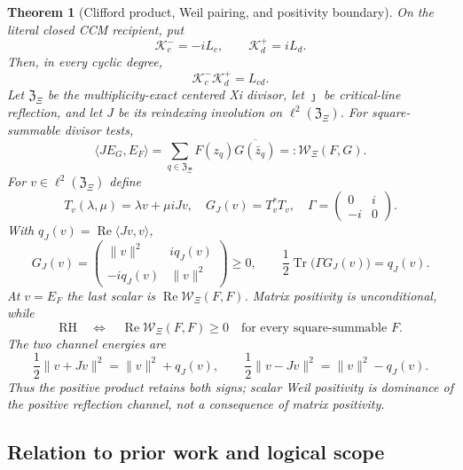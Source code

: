 \documentclass[11pt,reqno]{amsart}
\newtheorem{theorem}{Theorem}[section]
\newcommand{\Tr}{\operatorname{Tr}}
\begin{document}
\begin{theorem}[Clifford product, Weil pairing, and positivity boundary]
\label{thm:cliffordweil}
On the literal closed CCM recipient, put
\[
             \mathcal K_c^-=-iL_c,\qquad \mathcal K_d^+=iL_d.
\]
Then, in every cyclic degree,
\[
                    \mathcal K_c^-\mathcal K_d^+=L_{cd}.       \tag{1.22}
\]
Let $\mathfrak Z_\Xi$ be the multiplicity-exact centered Xi divisor, let
$\jmath$ be critical-line reflection, and let $J$ be its reindexing involution on
$\ell^2(\mathfrak Z_\Xi)$.  For square-summable divisor tests,
\[
 \langle JE_G,E_F\rangle
   =\sum_{q\in\mathfrak Z_\Xi}F(z_q)\overline{G(\bar z_q)}
   =:\mathcal W_\Xi(F,G).                              \tag{1.23}
\]
For $v\in\ell^2(\mathfrak Z_\Xi)$ define
\[
 T_v(\lambda,\mu)=\lambda v+\mu iJv,\quad
 G_J(v)=T_v^*T_v,\quad
 \Gamma=\begin{pmatrix}0&i\\-i&0\end{pmatrix}.
\]
With $q_J(v)=\operatorname{Re}\langle Jv,v\rangle$,
\[
 G_J(v)=
 \begin{pmatrix}\|v\|^2&iq_J(v)\\-iq_J(v)&\|v\|^2\end{pmatrix}\ge0,
 \qquad
 \frac12\Tr\bigl(\Gamma G_J(v)\bigr)=q_J(v).          \tag{1.24}
\]
At $v=E_F$ the last scalar is $\operatorname{Re}\mathcal W_\Xi(F,F)$.  Matrix
positivity is unconditional, while
\[
 \mathrm{RH}\quad\Longleftrightarrow\quad
 \operatorname{Re}\mathcal W_\Xi(F,F)\ge0
 \quad\text{for every square-summable }F.             \tag{1.25}
\]
The two channel energies are
\[
 \frac12\|v+Jv\|^2=\|v\|^2+q_J(v),\qquad
 \frac12\|v-Jv\|^2=\|v\|^2-q_J(v).                   \tag{1.26}
\]
Thus the positive product retains both signs; scalar Weil positivity is dominance of the positive
reflection channel, not a consequence of matrix positivity.
\end{theorem}

\subsection{Relation to prior work and logical scope}
\end{document}
